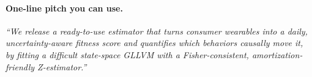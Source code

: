 \paragraph{One-line pitch you can use.}
\emph{“We release a ready-to-use estimator that turns consumer wearables into a daily, uncertainty-aware fitness score and quantifies which behaviors causally move it, by fitting a difficult state-space GLLVM with a Fisher-consistent, amortization-friendly Z-estimator.”}
